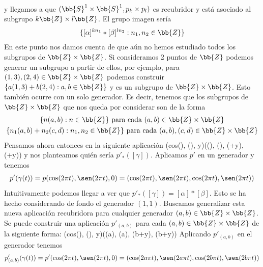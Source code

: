 \begin{ejemplo}
\begin{enumerate}
\begin{gather*}
        \end{gather*}
        y llegamos a que $(\bb{S}^1 \times \bb{S}^1, p_k\times p_l)$ es recubridor y está asociado al subgrupo $k\bb{Z}\times l\bb{Z}$. El grupo imagen sería
        \begin{gather*}
            \{[\alpha]^{kn_1}\ast [\beta]^{ln_2} : n_1,n_2\in \bb{Z}\}
        \end{gather*}
        En este punto nos damos cuenta de que aún no hemos estudiado todos los subgrupos de $\bb{Z}\times \bb{Z}$. Si consideramos 2 puntos de $\bb{Z}$ podemos generar un subgrupo a partir de ellos, por ejemplo, para $(1,3), (2,4)\in \bb{Z}\times \bb{Z}$ podemos construir $\{a(1,3)+b(2,4) : a,b\in \bb{Z}\}$ y es un subgrupo de $\bb{Z}\times \bb{Z}$. Esto también ocurre con un solo generador. Es decir, tenemos que los subgrupos de $\bb{Z}\times \bb{Z}$ que nos queda por considerar son de la forma
        \begin{gather*}
            \{n(a,b) : n\in \bb{Z}\} \text{ para cada } (a,b)\in \bb{Z}\times \bb{Z}\\
            \{n_1(a,b) + n_2(c,d) : n_1,n_2\in \bb{Z}\} \text{ para cada } (a,b), (c,d)\in \bb{Z}\times \bb{Z}
        \end{gather*}
        Pensamos ahora entonces en la siguiente aplicación
        {(cos(\theta), \sen(\theta), y)}{(\cos(\theta), \sen(\theta), \cos(\theta+y), \sen(\theta+y))}
        y nos planteamos quién sería $p'_*([\gamma])$. Aplicamos $p'$ en un generador y tenemos
        \begin{gather*}
            p'(\gamma(t)) = p(\cos(2\pi t), \sen(2\pi t), 0) = (\cos(2\pi t), \sen(2\pi t), \cos(2\pi t), \sen(2\pi t))
        \end{gather*}
        Intuitivamente podemos llegar a ver que $p'_*([\gamma]) = [\alpha] \ast [\beta]$.
        Esto se ha hecho considerando de fondo el generador $(1,1)$. Buscamos generalizar esta nueva aplicación recubridora para cualquier generador $(a,b)\in \bb{Z}\times \bb{Z}$. Se puede construir una aplicación $p'_{(a,b)}$ para cada $(a,b)\in \bb{Z}\times \bb{Z}$ de la siguiente forma:
        {(cos(\theta), \sen(\theta), y)}{(\cos(a\theta), \sen(a\theta), \cos(b\theta+y), \sen(b\theta+y))}
        Aplicando $p'_{(a,b)}$ en el generador tenemos
        \begin{gather*}
            p'_{(a,b)}(\gamma(t)) = p'(\cos(2\pi t), \sen(2\pi t), 0) = (\cos(2a\pi t), \sen(2a\pi t), \cos(2b\pi t), \sen(2b\pi t))
        \end{gather*}


\end{enumerate}
\end{ejemplo}
